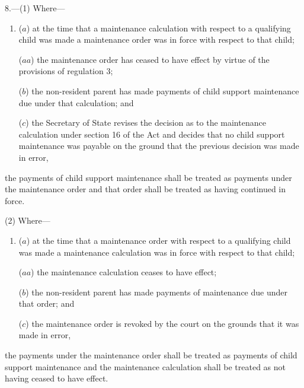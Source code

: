 \documentclass[12pt,a4paper]{article}
\begin{document}
8.—(1) Where—
\begin{enumerate}\item[]
($a$) at the time that a maintenance 
calculation with respect to a qualifying child was made a maintenance order was in force with respect to that child;

($aa$) the maintenance order has ceased to have effect by virtue of the provisions of regulation 3;

($b$) the 
non-resident parent
has made payments of child support maintenance due under that 
calculation; and

($c$) 
the Secretary of State revises the decision as to the maintenance calculation under section 16 of the Act and decides that no child support maintenance was payable on the ground that the previous decision was made in error,
\end{enumerate}
the payments of child support maintenance shall be treated as payments under the maintenance order and that order shall be treated as having continued in force.

(2) Where—
\begin{enumerate}\item[]
($a$) at the time that a maintenance order with respect to a qualifying child was made a maintenance 
calculation 
was in force with respect to that child;

($aa$) the maintenance 
calculation
ceases to have effect;

($b$) the 
non-resident parent 
has made payments of maintenance due under that order; and

($c$) the maintenance order is revoked by the court on the grounds that it was made in error,
\end{enumerate}
the payments under the maintenance order shall be treated as payments of child support maintenance and the maintenance 
calculation 
shall be treated 
as not having ceased to have effect. %
\end{document}
